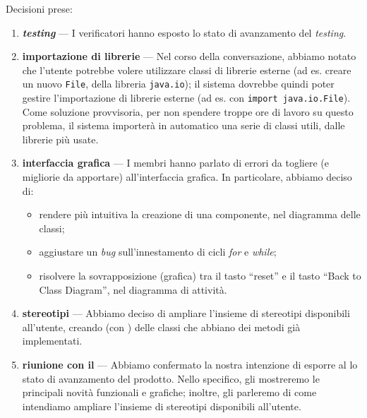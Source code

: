 Decisioni prese:
\begin{enumerate}
	\item \textbf{\emph{testing}} --- I verificatori hanno esposto lo stato di avanzamento del \emph{testing}.
	\item \textbf{importazione di librerie} --- Nel corso della conversazione, abbiamo notato che l'utente potrebbe volere utilizzare classi di librerie esterne (ad es. creare un nuovo \texttt{File}, della libreria \texttt{java.io}); il sistema dovrebbe quindi poter gestire l'importazione di librerie esterne (ad es. con \texttt{import java.io.File}). Come soluzione provvisoria, per non spendere troppe ore di lavoro su questo problema, il sistema importerà in automatico una serie di classi utili, dalle librerie più usate.
	\item \textbf{interfaccia grafica} --- I membri hanno parlato di errori da togliere (e migliorie da apportare) all'interfaccia grafica. In particolare, abbiamo deciso di:
	\begin{itemize}
		\item rendere più intuitiva la creazione di una componente, nel diagramma delle classi;
		\item aggiustare un \emph{bug} sull'innestamento di cicli \emph{for} e \emph{while};
		\item risolvere la sovrapposizione (grafica) tra il tasto “reset” e il tasto “Back to Class Diagram”, nel diagramma di attività.
	\end{itemize}
	\item \textbf{stereotipi} --- Abbiamo deciso di ampliare l'insieme di stereotipi disponibili all'utente, creando (con \proj) delle classi che abbiano dei metodi già implementati.
	\item \textbf{riunione con il \GP} --- Abbiamo confermato la nostra intenzione di esporre al \GP{} lo stato di avanzamento del prodotto. Nello specifico, gli mostreremo le principali novità funzionali e grafiche; inoltre, gli parleremo di come intendiamo ampliare l'insieme di stereotipi disponibili all'utente.
\end{enumerate}


